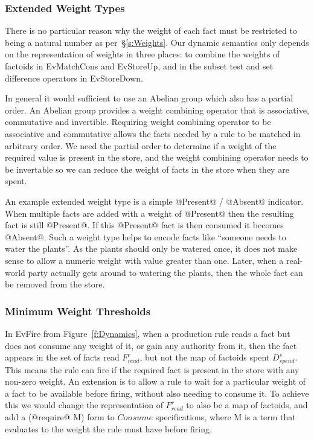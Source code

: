 \subsubsection{Extended Weight Types}
There is no particular reason why the weight of each fact must be restricted to being a natural number as per~\S\ref{s:Weights}. Our dynamic semantics only depends on the representation of weights in three places: to combine the weights of factoids in EvMatchCons and EvStoreUp, and in the subset test and set difference operators in EvStoreDown.

In general it would sufficient to use an Abelian group which also has a partial order. An Abelian group provides a weight combining operator that is associative, commutative and invertible. Requiring weight combining operator to be associative and commutative allows the facts needed by a rule to be matched in arbitrary order. We need the partial order to determine if a weight of the required value is present in the store, and the weight combining operator needs to be invertable so we can reduce the weight of facts in the store when they are spent.

An example extended weight type is a simple @Present@ / @Absent@ indicator. When multiple facts are added with a weight of @Present@ then the resulting fact is still @Present@. If this @Present@ fact is then consumed it becomes @Absent@. Such a weight type helps to encode facts like ``someone needs to water the plants''. As the plants should only be watered once, it does not make sense to allow a numeric weight with value greater than one. Later, when a real-world party actually gets around to watering the plants, then the whole fact can be removed from the store.


\subsubsection{Minimum Weight Thresholds}
In EvFire from Figure~\ref{f:Dynamics}, when a production rule reads a fact but does not consume any weight of it, or gain any authority from it, then the fact appears in the set of facts read $F^r_{read}$, but not the map of factoids spent $D^s_{spend}$. This means the rule can fire if the required fact is present in the store with any non-zero weight. An extension is to allow a rule to wait for a particular weight of a fact to be available before firing, without also needing to consume it. To achieve this we would change the representation of $F^r_{read}$ to also be a map of factoids, and add a (@require@ M) form to $Consume$ specifications, where M is a term that evaluates to the weight the rule must have before firing.


